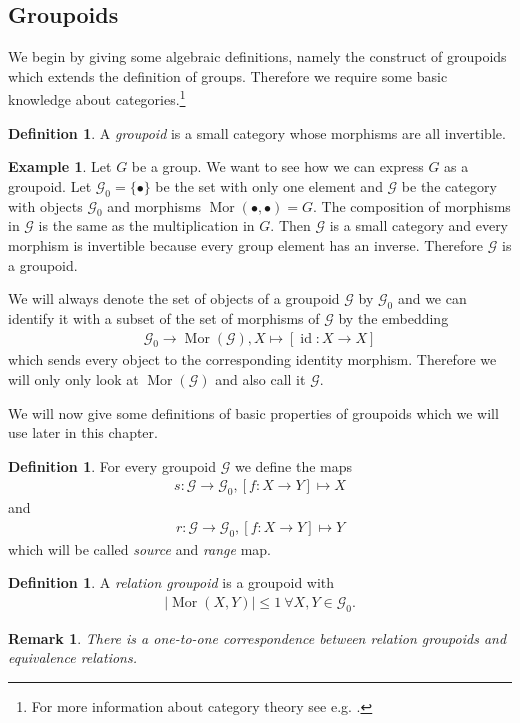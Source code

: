 \documentclass[12pt,a4paper]{scrartcl}
\theoremstyle{plain}
\newtheorem{Remark}[Theorem]{Remark}
\theoremstyle{definition}
\newtheorem{Definition}[Theorem]{Definition}
\newtheorem{Example}[Theorem]{Example}
\newcommand{\2}{\mathbb{Z} / 2 \mathbb{Z}}
\newcommand{\G}{\mathcal{G}}
\newcommand{\1}{\bar{1}}
\newcommand{\0}{\bar{0}}
\newcommand{\id}{\operatorname{id}}
\newcommand{\Mor}{\operatorname{Mor}}
\begin{document}
\subsection{Groupoids}
We begin by giving some algebraic definitions, namely the construct of groupoids which extends the definition of groups. Therefore we require some basic knowledge about categories.\footnote{For more information about category theory see e.g. \cite{BOR}.}
\begin{Definition}
	A \emph{groupoid} is a small category whose morphisms are all invertible.
\end{Definition}
\begin{Example} \label{group}
	Let $G$ be a group. We want to see how we can express $G$ as a groupoid. Let $\mathcal{G}_0 = \{\bullet\}$ be the set with only one element  and $\mathcal{G}$ be the category with objects $\G_0$ and morphisms $\Mor(\bullet, \bullet) = G$. The composition of morphisms in $\mathcal{G}$ is the same as the multiplication in $G$. Then $\mathcal{G}$ is a small category and every morphism is invertible because every group element has an inverse. Therefore $\mathcal{G}$ is a groupoid.
\end{Example}
We will always denote the set of objects of a groupoid $\mathcal{G}$ by $\mathcal{G}_0$ and we can identify it with a subset of the set of morphisms of $\mathcal{G}$ by the embedding 
\begin{align*}
	\mathcal{G}_0 \to \Mor(\mathcal{G}), X \mapsto [\id\colon X \to X]
\end{align*}
which sends every object to the corresponding identity morphism. Therefore we will only only look at $\Mor(\mathcal{G})$ and also call it $\mathcal{G}$. 

We will now give some definitions of basic properties of groupoids which we will use later in this chapter.

\begin{Definition}
	For every groupoid $\mathcal{G}$ we define the maps
	\begin{align*}
		s\colon \mathcal{G} \to \mathcal{G}_0, [f\colon X \to Y] \mapsto X
	\end{align*}
	and
	\begin{align*}
		r\colon\mathcal{G} \to \mathcal{G}_0, [f\colon X \to Y] \mapsto Y
	\end{align*}
	which will be called \emph{source} and \emph{range} map.
\end{Definition}
\begin{Definition}
	A \emph{relation groupoid} is a groupoid with 
	\begin{align*}
		|\Mor(X, Y)| \leq 1 \ \forall X,Y \in \G_0.
	\end{align*}
\end{Definition}
\begin{Remark}
	There is a one-to-one correspondence between relation groupoids and equivalence relations.
\end{Remark}
\end{document}
